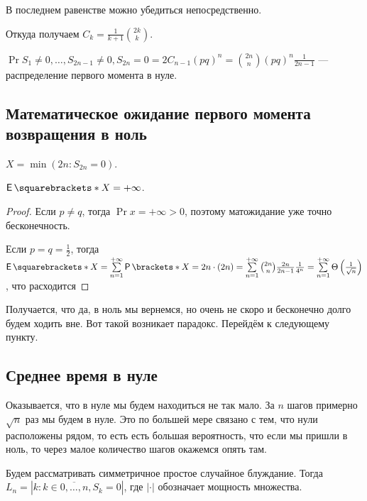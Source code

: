 В последнем равенстве можно убедиться непосредственно.

Откуда получаем $C_k = \frac{1}{k + 1}\binom{2k}{k}$.

\begin{remark}
  $\Pr{S_1 \neq 0, \ldots, S_{2n - 1} \neq 0, S_{2n} = 0} = 2C_{n - 1}(pq)^n =
  \binom{2n}{n}(pq)^n\frac{1}{2n - 1}$ --- распределение первого момента в нуле.
\end{remark}

\subsection{Математическое ожидание первого момента возвращения в ноль}

\begin{definition}
  $X = \min(2n : S_{2n} = 0)$.
\end{definition}

\begin{theorem}
  $\E{X} = +\infty$.
\end{theorem}

\begin{proof}
  Если $p \neq q$, тогда $\Pr{x = +\infty} > 0$, поэтому матожидание уже
  точно бесконечность.

  Если $p = q = \frac{1}{2}$, тогда $\E{X} = \sum\limits_{n = 1}^{+\infty}
  \Pr{X = 2n}\cdot (2n) = \sum\limits_{n = 1}^{+\infty} \binom{2n}{n} 
  \frac{2n}{2n - 1}\frac{1}{4^n} = \sum\limits_{n = 1}^{+\infty}\Theta\left(\frac{1}{\sqrt{n}}\right)$, что расходится
\end{proof}

Получается, что да, в ноль мы вернемся, но очень не скоро и бесконечно долго будем
ходить вне. Вот такой возникает парадокс. Перейдём к следующему пункту.

\subsection{Среднее время в нуле}

Оказывается, что в нуле мы будем находиться не так мало. За $n$ шагов примерно
$\sqrt{n}$ раз мы будем в нуле. Это по большей мере связано с тем, что нули
расположены рядом, то есть есть большая вероятность, что если мы пришли в ноль,
то через малое количество шагов окажемся опять там.

\begin{definition}
  Будем рассматривать симметричное простое случайное блуждание. Тогда 
  $L_n = \left|k : k \in \overline{0, \ldots, n}, S_k = 0\right|$, где $|\cdot|$
  обозначает мощность множества.
\end{definition}

